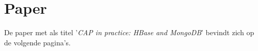 \chapter{Paper}\label{sec:paper}
De paper met als titel '\textit{CAP in practice: HBase and MongoDB}' bevindt zich op de volgende pagina's. 

